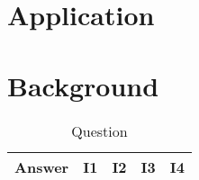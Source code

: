 \section{Application}

\section{Background}



\begin{table}
    \begin{tabular}{|c|c c c c|} 
        \toprule
        Answer & I1 & I2 & I3 & I4 \\
        \midrule
        
        \toprule
    \end{tabular}
    \caption{Question}
    \label{table:a:1}
\end{table}